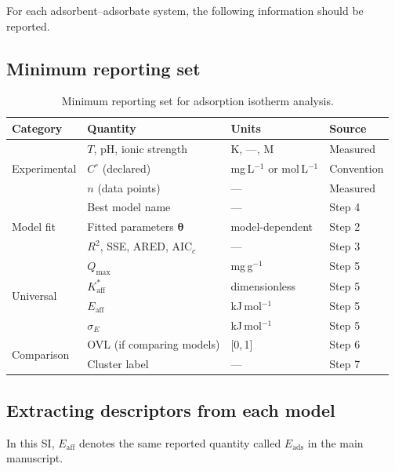 \documentclass[journal=jacsat,manuscript=article]{achemso}
\begin{document}
For each adsorbent--adsorbate system, the following information
should be reported.

\subsection{Minimum reporting set}
\label{sec:si_reporting}

\begin{table}[H]
	\centering
	\small
	\caption{Minimum reporting set for adsorption isotherm analysis.}
	\label{tab:si_reporting}
	\renewcommand{\arraystretch}{1.3}
	\begin{tabular}{@{} l l l l @{}}
		\toprule
		\textbf{Category} & \textbf{Quantity} & \textbf{Units}
		& \textbf{Source} \\
		\midrule
		\multirow{3}{*}{Experimental}
		& $T$, pH, ionic strength & K, ---, M & Measured \\
		& $C^\circ$ (declared) & mg\,L$^{-1}$ or mol\,L$^{-1}$ & Convention \\
		& $n$ (data points) & --- & Measured \\
		\midrule
		\multirow{3}{*}{Model fit}
		& Best model name & --- & Step 4 \\
		& Fitted parameters $\boldsymbol{\theta}$ & model-dependent & Step 2 \\
		& $R^2$, SSE, ARED, AIC$_c$ & --- & Step 3 \\
		\midrule
		\multirow{4}{*}{Universal}
		& $Q_{\max}$ & mg\,g$^{-1}$ & Step 5 \\
		& $K_{\mathrm{aff}}^{\ast}$ & dimensionless & Step 5 \\
		& $E_{\mathrm{aff}}$ & kJ\,mol$^{-1}$ & Step 5 \\
		& $\sigma_E$ & kJ\,mol$^{-1}$ & Step 5 \\
		\midrule
		\multirow{2}{*}{Comparison}
		& OVL (if comparing models) & [0,\,1] & Step 6 \\
		& Cluster label & --- & Step 7 \\
		\bottomrule
	\end{tabular}
\end{table}

\subsection{Extracting descriptors from each model}
\label{sec:si_extraction}

\noindent In this SI, $E_{\mathrm{aff}}$ denotes the same reported
quantity called $E_{\mathrm{ads}}$ in the main manuscript.
\end{document}
